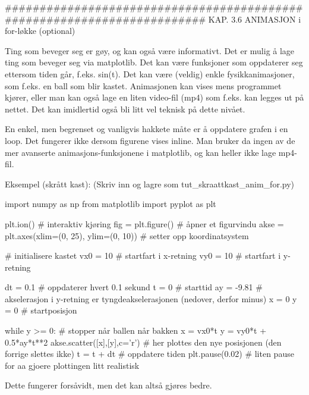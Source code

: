 ######################################################################## 
KAP. 3.6  ANIMASJON i for-løkke  (optional)

Ting som beveger seg er gøy, og kan også være informativt. 
Det er mulig å lage ting som beveger seg via matplotlib.
Det kan være funksjoner som oppdaterer seg ettersom tiden går, f.eks. sin(t).
Det kan være (veldig) enkle fysikkanimasjoner, som f.eks. en ball som blir kastet.
Animasjonen kan vises mens programmet kjører, eller man kan også lage en liten
video-fil (mp4) som f.eks. kan legges ut på nettet.
Det kan imidlertid også bli litt vel teknisk på dette nivået. 


En enkel, men begrenset og vanligvis hakkete måte er å oppdatere grafen i en loop. 
Det fungerer ikke dersom figurene vises inline.
Man bruker da ingen av de mer avanserte animasjons-funksjonene i matplotlib,
og kan heller ikke lage mp4-fil.

Eksempel (skrått kast):
(Skriv inn og lagre som tut_skraattkast_anim_for.py) 

import numpy as np
from matplotlib import pyplot as plt

plt.ion()   # interaktiv kjøring
fig = plt.figure()    # åpner et figurvindu
akse = plt.axes(xlim=(0, 25), ylim=(0, 10))  # setter opp koordinatsystem

# initialisere kastet
vx0 = 10       # startfart i x-retning
vy0 = 10       # startfart i y-retning

dt = 0.1       # oppdaterer hvert 0.1 sekund
t = 0          # starttid
ay = -9.81     # akselerasjon i y-retning er tyngdeakselerasjonen (nedover, derfor minus)
x = 0 
y = 0          # startposisjon 

while y >= 0:  # stopper når ballen når bakken
    x = vx0*t
    y = vy0*t + 0.5*ay*t**2
    akse.scatter([x],[y],c='r')  # her plottes den nye posisjonen (den forrige slettes ikke)
    t = t + dt          # oppdatere tiden
    plt.pause(0.02)     # liten pause for aa gjoere plottingen litt realistisk



Dette fungerer forsåvidt, men det kan altså gjøres bedre.



